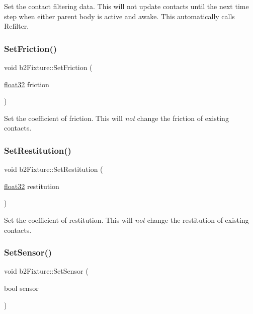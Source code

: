 Set the contact filtering data. This will not update contacts until the next time step when either parent body is active and awake. This automatically calls Refilter. \mbox{\label{classb2_fixture_ad0cd91eef5858c8ef1d6b62cc2a34ea2}} 
\subsubsection{\texorpdfstring{SetFriction()}{SetFriction()}}
{\footnotesize\ttfamily void b2\+Fixture\+::\+Set\+Friction (\begin{DoxyParamCaption}\item[{\mbox{\hyperlink{b2_settings_8h_aacdc525d6f7bddb3ae95d5c311bd06a1}{float32}}}]{friction }\end{DoxyParamCaption})\hspace{0.3cm}{\ttfamily [inline]}}

Set the coefficient of friction. This will {\itshape not} change the friction of existing contacts. \mbox{\label{classb2_fixture_a19c507332e4f7bd04a05f00426f11ee4}} 
\subsubsection{\texorpdfstring{SetRestitution()}{SetRestitution()}}
{\footnotesize\ttfamily void b2\+Fixture\+::\+Set\+Restitution (\begin{DoxyParamCaption}\item[{\mbox{\hyperlink{b2_settings_8h_aacdc525d6f7bddb3ae95d5c311bd06a1}{float32}}}]{restitution }\end{DoxyParamCaption})\hspace{0.3cm}{\ttfamily [inline]}}

Set the coefficient of restitution. This will {\itshape not} change the restitution of existing contacts. \mbox{\label{classb2_fixture_a6198a81dcee0fe814d730383ebfa7038}} 
\subsubsection{\texorpdfstring{SetSensor()}{SetSensor()}}
{\footnotesize\ttfamily void b2\+Fixture\+::\+Set\+Sensor (\begin{DoxyParamCaption}\item[{bool}]{sensor }\end{DoxyParamCaption})}



